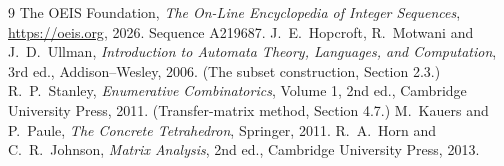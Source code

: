\documentclass[11pt,a4paper]{article}
\theoremstyle{plain}
\theoremstyle{definition}
\begin{document}
\begin{thebibliography}{9}
 The OEIS Foundation, \emph{The On-Line Encyclopedia of Integer
Sequences}, \url{https://oeis.org}, 2026. Sequence A219687.
 J.~E.~Hopcroft, R.~Motwani and J.~D.~Ullman, \emph{Introduction to Automata
Theory, Languages, and Computation}, 3rd ed., Addison--Wesley, 2006. (The subset
construction, Section 2.3.)
 R.~P.~Stanley, \emph{Enumerative Combinatorics}, Volume 1, 2nd ed.,
Cambridge University Press, 2011. (Transfer-matrix method, Section 4.7.)
 M.~Kauers and P.~Paule, \emph{The Concrete Tetrahedron}, Springer, 2011.
 R.~A.~Horn and C.~R.~Johnson, \emph{Matrix Analysis}, 2nd ed., Cambridge
University Press, 2013.
\end{thebibliography}
\end{document}
